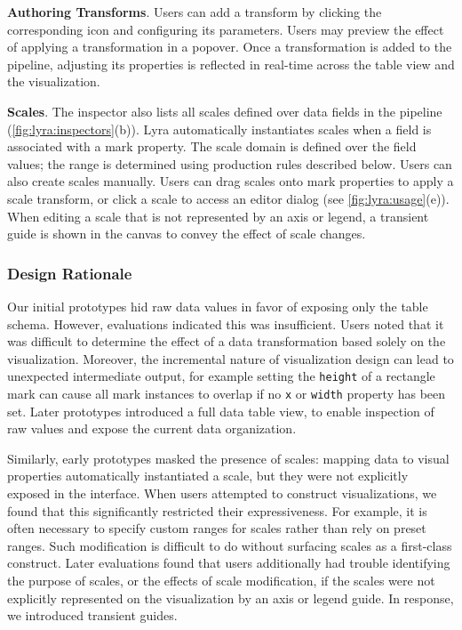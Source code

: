 \textbf{Authoring Transforms}. Users can add a transform by clicking the
corresponding icon and configuring its parameters. Users may preview the effect
of applying a transformation in a popover. Once a transformation is added to the
pipeline, adjusting its properties is reflected in real-time across the table
view and the visualization.

\textbf{Scales}. The inspector also lists all scales defined over data fields in
the pipeline (\cref{fig:lyra:inspectors}(b)). Lyra automatically instantiates
scales when a field is associated with a mark property. The scale domain is
defined over the field values; the range is determined using production rules
described below. Users can also create scales manually. Users can drag scales
onto mark properties to apply a scale transform, or click a scale to access an
editor dialog (see \cref{fig:lyra:usage}(e)). When editing a scale that is not
represented by an axis or legend, a transient guide is shown in the canvas to
convey the effect of scale changes.

\subsubsection{Design Rationale}

Our initial prototypes hid raw data values in favor of exposing only the table
schema. However, evaluations indicated this was insufficient. Users noted that
it was difficult to determine the effect of a data transformation based solely
on the visualization. Moreover, the incremental nature of visualization design
can lead to unexpected intermediate output, for example setting the
\texttt{height} of a rectangle mark can cause all mark instances to overlap if
no \texttt{x} or \texttt{width} property has been set. Later prototypes
introduced a full data table view, to enable inspection of raw values and expose
the current data organization.

Similarly, early prototypes masked the presence of scales: mapping data to
visual properties automatically instantiated a scale, but they were not
explicitly exposed in the interface. When users attempted to construct
visualizations, we found that this significantly restricted their
expressiveness. For example, it is often necessary to specify custom ranges
for scales rather than rely on preset ranges. Such modification is difficult
to do without surfacing scales as a first-class construct. Later evaluations
found that users additionally had trouble identifying the purpose of scales,
or the effects of scale modification, if the scales were not explicitly
represented on the visualization by an axis or legend guide. In response, we
introduced transient guides.

